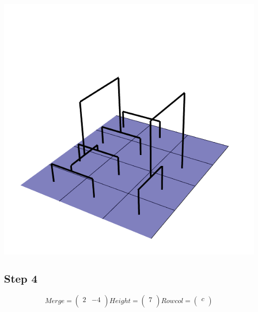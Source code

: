\documentclass{article}
\begin{document}
\centering \includegraphics[scale=0.3]{step3}

\raggedright\subsection{Step 4}
\[
Merge =  \left(\begin{array}{cc}
2 & -4 \\
\end{array} \right)
%
Height = \left( \begin{array}{c}
7 \\
\end{array} \right)
%
Rowcol = \left( \begin{array}{c}
c \\
\end{array} \right)
\]  
\end{document}
